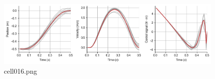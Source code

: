 \begin{figure}[ht]
	\centering
	\includegraphics[scale=0.8, max width=\linewidth]{./fig/motor-learning/local-learning-ofc/cell016.png}
	\caption{cell016.png}
	\label{cell016.png}
\end{figure}